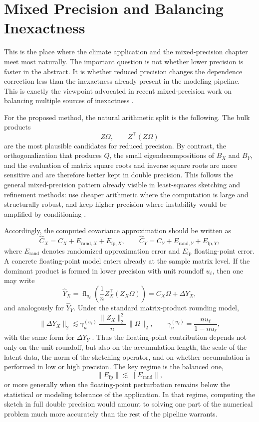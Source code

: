 \section{Mixed Precision and Balancing Inexactness}

This is the place where the climate application and the mixed-precision chapter meet most naturally. The important question is not whether lower precision is faster in the abstract. It is whether reduced precision changes the dependence correction less than the inexactness already present in the modeling pipeline. This is exactly the viewpoint advocated in recent mixed-precision work on balancing multiple sources of inexactness \cite{carson2026balancing,higham2022mixed}.

For the proposed method, the natural arithmetic split is the following. The bulk products
\[
	Z\Omega, \qquad Z^\top(Z\Omega)
\]
are the most plausible candidates for reduced precision. By contrast, the orthogonalization that produces \(Q\), the small eigendecompositions of \(B_X\) and \(B_Y\), and the evaluation of matrix square roots and inverse square roots are more sensitive and are therefore better kept in double precision. This follows the general mixed-precision pattern already visible in least-squares sketching and refinement methods: use cheaper arithmetic where the computation is large and structurally robust, and keep higher precision where instability would be amplified by conditioning \cite{carson2024mixedsketching,higham2021lowerprecision}.

Accordingly, the computed covariance approximation should be written as
\[
	\widehat C_X = C_X + E_{\mathrm{rand},X} + E_{\mathrm{fp},X},
	\qquad
	\widehat C_Y = C_Y + E_{\mathrm{rand},Y} + E_{\mathrm{fp},Y},
\]
where \(E_{\mathrm{rand}}\) denotes randomized approximation error and \(E_{\mathrm{fp}}\) floating-point error. A concrete floating-point model enters already at the sample matrix level. If the dominant product is formed in lower precision with unit roundoff \(u_\ell\), then one may write
\[
	\widehat Y_X
	=
	\operatorname{fl}_{u_\ell}\!\left(\frac1n Z_X^\top(Z_X\Omega)\right)
	=
	C_X\Omega + \Delta Y_X,
\]
and analogously for \(\widehat Y_Y\). Under the standard matrix-product rounding model,
\[
	\|\Delta Y_X\|_2
	\lesssim
	\gamma_n^{(u_\ell)}\,\frac{\|Z_X\|_2^2}{n}\,\|\Omega\|_2,
	\qquad
	\gamma_n^{(u_\ell)} = \frac{n u_\ell}{1-n u_\ell},
\]
with the same form for \(\Delta Y_Y\) \cite{higham2022mixed}. Thus the floating-point contribution depends not only on the unit roundoff, but also on the accumulation length, the scale of the latent data, the norm of the sketching operator, and on whether accumulation is performed in low or high precision. The key regime is the balanced one,
\[
	\|E_{\mathrm{fp}}\| \lesssim \|E_{\mathrm{rand}}\|,
\]
or more generally when the floating-point perturbation remains below the statistical or modeling tolerance of the application. In that regime, computing the sketch in full double precision would amount to solving one part of the numerical problem much more accurately than the rest of the pipeline warrants.

